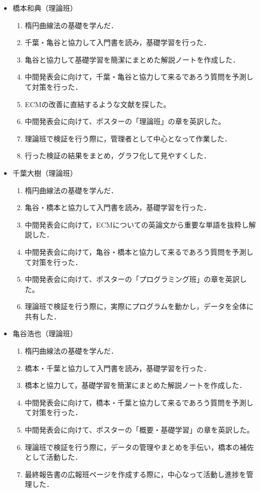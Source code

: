 \documentclass[openany,11pt,papersize]{jsbook}
\begin{document}
\begin{itemize}
\item 橋本和典（理論班）
 \begin{enumerate}
 \renewcommand{\labelenumi}{(\arabic{enumi})}
 \item 楕円曲線法の基礎を学んだ．
 \item 千葉・亀谷と協力して入門書を読み，基礎学習を行った．
 \item 亀谷と協力して基礎学習を簡潔にまとめた解説ノートを作成した．
 \item 中間発表会に向けて，千葉・亀谷と協力して来るであろう質問を予測して対策を行った．
 \item ECMの改善に直結するような文献を探した。
 \item 中間発表会に向けて、ポスターの「理論班」の章を英訳した。
 \item 理論班で検証を行う際に，管理者として中心となって作業した．
 \item 行った検証の結果をまとめ，グラフ化して見やすくした．
 \end{enumerate}
 
\item 千葉大樹（理論班）
 \begin{enumerate}
 \renewcommand{\labelenumi}{(\arabic{enumi})}
 \item 楕円曲線法の基礎を学んだ．
 \item 亀谷・橋本と協力して入門書を読み，基礎学習を行った．
 \item 中間発表会に向けて，ECMについての英論文から重要な単語を抜粋し解説した．
 \item 中間発表会に向けて，亀谷・橋本と協力して来るであろう質問を予測して対策を行った．
 \item 中間発表会に向けて、ポスターの「プログラミング班」の章を英訳した。
 \item 理論班で検証を行う際に，実際にプログラムを動かし，データを全体に共有した．
 \end{enumerate}
 
\item 亀谷浩也（理論班）
 \begin{enumerate}
 \renewcommand{\labelenumi}{(\arabic{enumi})}
 \item 楕円曲線法の基礎を学んだ．
 \item 橋本・千葉と協力して入門書を読み，基礎学習を行った．
 \item 橋本と協力して，基礎学習を簡潔にまとめた解説ノートを作成した．
 \item 中間発表会に向けて，橋本・千葉と協力して来るであろう質問を予測して対策を行った．
 \item 中間発表会に向けて、ポスターの「概要・基礎学習」の章を英訳した。
 \item 理論班で検証を行う際に，データの管理やまとめを手伝い，橋本の補佐として活動した．
 \item 最終報告書の広報班ページを作成する際に，中心なって活動し進捗を管理した．
 \end{enumerate}
 
\end{itemize}

\end{document}
